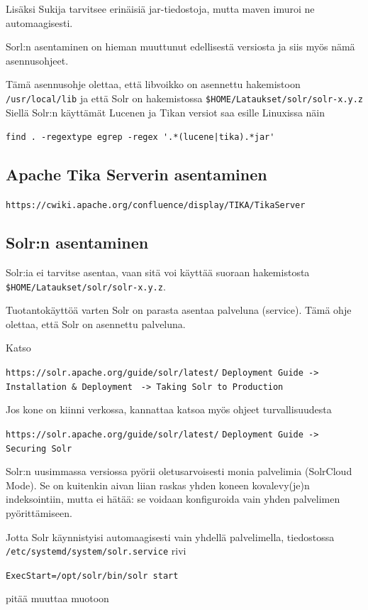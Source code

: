 \documentclass[12pt]{article}
\begin{document}
Lisäksi Sukija tarvitsee erinäisiä jar-tiedostoja, mutta maven imuroi
ne automaagisesti.

Sorl:n asentaminen on hieman muuttunut edellisestä versiosta ja siis
myös nämä asennusohjeet.

\bigskip
Tämä asennusohje olettaa, että libvoikko on asennettu hakemistoon
\verb=/usr/local/lib= ja että Solr on hakemistossa
\verb=$HOME/Lataukset/solr/solr-x.y.z= Siellä Solr:n käyttämät Lucenen
ja Tikan versiot saa esille Linuxissa näin

\verb=find . -regextype egrep -regex '.*(lucene|tika).*jar'=


\subsection*{Apache Tika Serverin asentaminen}

\verb=https://cwiki.apache.org/confluence/display/TIKA/TikaServer=


\newpage
\subsection*{Solr:n asentaminen}

Solr:ia ei tarvitse asentaa, vaan sitä voi käyttää suoraan
hakemistosta \verb=$HOME/Lataukset/solr/solr-x.y.z=.

Tuotantokäyttöä varten Solr on parasta asentaa palveluna (service).
Tämä ohje olettaa, että Solr on asennettu palveluna.

Katso

\verb=https://solr.apache.org/guide/solr/latest/=
\verb=Deployment Guide -> Installation & Deployment=
\verb= -> Taking Solr to Production=


Jos kone on kiinni verkossa, kannattaa katsoa myös ohjeet turvallisuudesta

\verb=https://solr.apache.org/guide/solr/latest/=
\verb=Deployment Guide -> Securing Solr=


\bigskip
Solr:n uusimmassa versiossa pyörii oletusarvoisesti monia palvelimia
(SolrCloud Mode). Se on kuitenkin aivan liian raskas yhden koneen
kovalevy(je)n indeksointiin, mutta ei hätää: se voidaan konfiguroida
vain yhden palvelimen pyörittämiseen.


\bigskip
Jotta Solr käynnistyisi automaagisesti vain yhdellä palvelimella,
tiedostossa
\verb|/etc/systemd/system/solr.service|
rivi

\verb|ExecStart=/opt/solr/bin/solr start|

pitää muuttaa muotoon
\end{document}

